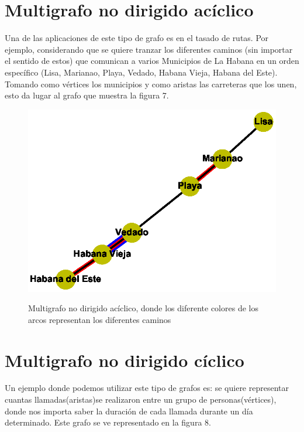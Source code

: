 \documentclass{article}
\begin{document}
 \section{Multigrafo no dirigido acíclico}
Una de las aplicaciones de este tipo de grafo es en el tasado de rutas.
Por ejemplo, considerando que se quiere tranzar los diferentes caminos (sin importar el sentido de estos) que comunican a varios Municipios de La Habana en un orden específico (Lisa, Marianao, Playa, Vedado, Habana Vieja, Habana del Este). Tomando como vértices los municipios y como aristas las carreteras que los unen, esto da lugar al grafo que muestra la figura 7.
\begin{center}

\end{center}
\begin{figure}[h]
\begin{center}
\includegraphics[scale=0.7]{Graf7.eps}\\
\caption{Multigrafo no dirigido acíclico, donde los diferente colores de los arcos representan los diferentes caminos}
\end{center}
\end{figure}
\section{Multigrafo no dirigido cíclico}

Un ejemplo donde podemos utilizar este tipo de grafos es: se quiere representar cuantas llamadas(aristas)se realizaron entre un grupo de personas(vértices), donde nos importa saber la duración de cada llamada durante un día determinado. Este grafo se ve representado en la figura 8.
\end{document}
